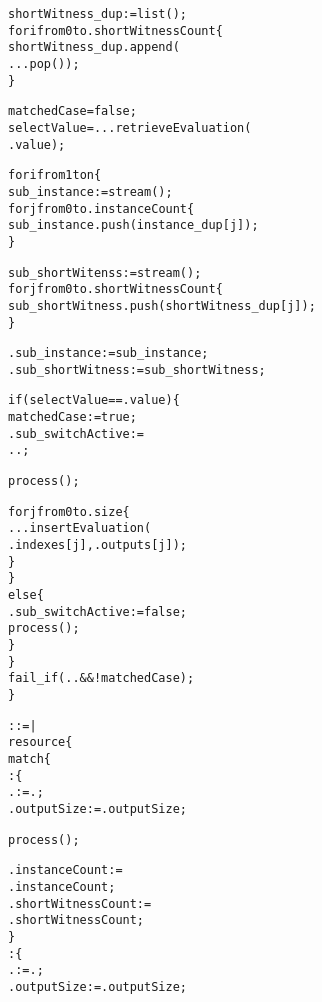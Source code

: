 \begin{alltt}
    shortWitness_dup := list();
    for i from 0 to .shortWitnessCount \{
      shortWitness_dup.append(
        ...pop());
    \}

    matchedCase = false;
    selectValue = ...retrieveEvaluation(
      .value);

    for i from 1 to n \{
      sub_instance := stream();
      for j from 0 to .instanceCount \{
        sub_instance.push(instance_dup[j]);
      \}

      sub_shortWitenss := stream();
      for j from 0 to .shortWitnessCount \{
        sub_shortWitness.push(shortWitness_dup[j]);
      \}
      
      .sub_instance := sub_instance;
      .sub_shortWitness := sub_shortWitness;

      if(selectValue == .value) \{
        matchedCase := true;
        .sub_switchActive :=
          ..;

        process();

        for j from 0 to .size \{
          ...insertEvaluation(
            .indexes[j], .outputs[j]);
        \}
      \}
      else \{
        .sub_switchActive := false;
        process();
      \}
    \}
    fail_if(.. && !matchedCase);
  \}\ttSyn

   ::=  | \ttSem
  resource \{
    match \{
      : \{
        . := .;
        .outputSize := .outputSize;

        process();

        .instanceCount :=
          .instanceCount;
        .shortWitnessCount :=
          .shortWitnessCount;
      \}
      : \{
        . := .;
        .outputSize := .outputSize;


\end{alltt}
